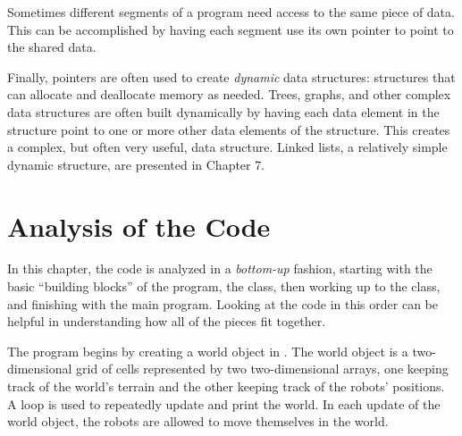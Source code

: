 Sometimes different segments of a program need access to the same piece of data.  This can be accomplished by having each segment use its own pointer to point to the shared data.

Finally, pointers are often used to create \emph{dynamic} data structures: structures that can allocate and deallocate memory as needed.  Trees, graphs, and other complex data structures are often built dynamically by having each data element in the structure point to one or more other data elements of the structure.  This creates a complex, but often very useful, data structure.  Linked lists, a relatively simple dynamic structure, are presented in Chapter 7.

\section{Analysis of the Code}

In this chapter, the code is analyzed in a \emph{bottom-up} fashion, starting with the basic ``building blocks'' of the program, the  class, then working up to the  class, and finishing with the main program.  Looking at the code in this order can be helpful in understanding how all of the pieces fit together.

The program begins by creating a world object in .  The world object is a two-dimensional grid of cells represented by two two-dimensional arrays, one keeping track of the world's terrain and the other keeping track of the robots' positions. 
 A loop is used to repeatedly update and print the world.  In each update of the world object, the robots are allowed to move themselves in the world.  





